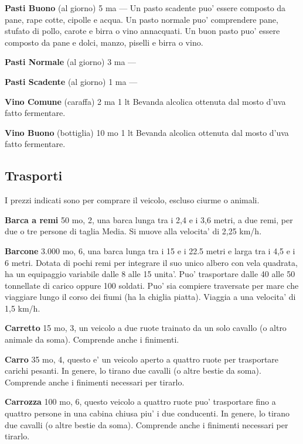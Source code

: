 \documentclass[a4paper,11pt,twoside,openany]{book}
\begin{document}
{		\textbf{Pasti Buono} (al giorno) 5 ma --- Un pasto scadente puo' essere composto da pane, rape cotte, cipolle e acqua. Un pasto normale puo' comprendere pane, stufato di pollo, carote e birra o vino annacquati. Un buon pasto puo' essere composto da pane e dolci, manzo, piselli e birra o vino.
		
		\textbf{Pasti Normale} (al giorno) 3 ma ---
		
		\textbf{Pasti Scadente} (al giorno) 1 ma ---
		
		\textbf{Vino Comune} (caraffa) 2 ma 1 lt Bevanda alcolica ottenuta dal mosto d'uva fatto fermentare.
		
		\textbf{Vino Buono} (bottiglia) 10 mo 1 lt Bevanda alcolica ottenuta dal mosto d'uva fatto fermentare.
		
		\pagebreak
		
		\subsection{Trasporti}
		
		\label{trasporti}
		
		I prezzi indicati sono per comprare il veicolo, escluso ciurme o animali.
		
		\textbf{Barca a remi} 50 mo, 2, una barca lunga tra i 2,4 e i 3,6 metri, a due remi, per due o tre persone di taglia Media. Si muove alla velocita' di 2,25 km/h.
		
		\textbf{Barcone} 3.000 mo, 6, una barca lunga tra i 15 e i 22.5 metri e larga tra i 4,5 e i 6 metri. Dotata di pochi remi per integrare il suo unico albero con vela quadrata, ha un equipaggio variabile dalle 8 alle 15 unita'. Puo' trasportare dalle 40 alle 50 tonnellate di carico oppure 100 soldati. Puo' sia compiere traversate per mare che viaggiare lungo il corso dei fiumi (ha la chiglia piatta). Viaggia a una velocita' di 1,5 km/h.
		
		\textbf{Carretto} 15 mo, 3, un veicolo a due ruote trainato da un solo cavallo (o altro animale da soma). Comprende anche i finimenti.
		
		\textbf{Carro} 35 mo, 4, questo e' un veicolo aperto a quattro ruote per trasportare carichi pesanti. In genere, lo tirano due cavalli (o altre bestie da soma). Comprende anche i finimenti necessari per tirarlo.
		
		\textbf{Carrozza} 100 mo, 6, questo veicolo a quattro ruote puo' trasportare fino a quattro persone in una cabina chiusa piu' i due conducenti. In genere, lo tirano due cavalli (o altre bestie da soma). Comprende anche i finimenti necessari per tirarlo.
		
}
\end{document}
